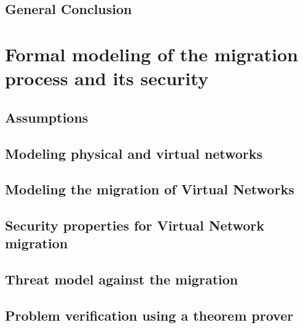 \documentclass[a4paper, 11pt]{report}
\theoremstyle{definition}
\begin{document}
% 



\section{General Conclusion}


\newpage
\chapter{Formal modeling of the migration process and its security}
\label{sec:formal_model}


% 

\section{Assumptions}


\section{Modeling physical and virtual networks}


\newpage
\section{Modeling the migration of Virtual Networks}


\newpage
\section{Security properties for Virtual Network migration}



\newpage
\section{Threat model against the migration}


\section{Problem verification using a theorem prover}

\end{document}
